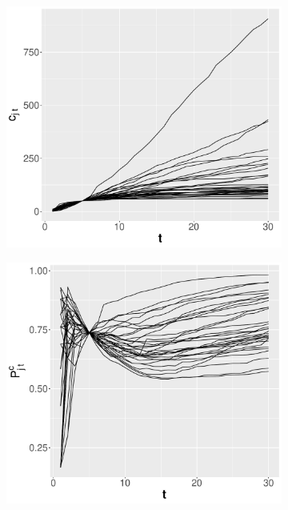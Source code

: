 \begin{figure}
     \centering
     \begin{subfigure}[b]{0.48\textwidth}
         \centering
         \includegraphics[width=\textwidth]{figures/pred_power/ncit_vs_pubrp/cit_age.pdf}
         \caption{}
         \label{fig:pred_cit_age}
     \end{subfigure}
     \hfill
     \begin{subfigure}[b]{0.48\textwidth}
         \centering
         \includegraphics[width=\textwidth]{figures/pred_power/ncit_vs_pubrp/rp_age.pdf}

\end{subfigure}
\end{figure}
